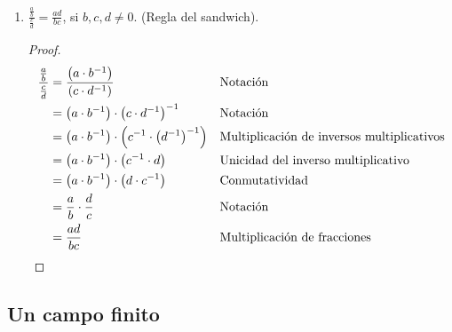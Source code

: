 \documentclass[11pt]{article}
\begin{document}
\begin{enumerate}[label=\alph*)]

    \item $\frac{\frac{a}{b}}{\frac{c}{d}} = \frac{ad}{bc}$, si $b, c, d \neq 0$. (Regla del sandwich).
    \vspace{-1em}\begin{proof} 
        \begin{align*}
            \frac{\frac{a}{b}}{\frac{c}{d}} &= \frac{\left( a \cdot b^{-1} \right)}{\left( c \cdot d^{-1} \right)} && \text{Notación}\\
            &= \left( a \cdot b^{-1} \right) \cdot \left( c \cdot d^{-1} \right)^{-1} && \text{Notación}\\
            &= \left( a \cdot b^{-1} \right) \cdot \left( c^{-1} \cdot \left( d^{-1} \right) ^{-1} \right) && \text{Multiplicación de inversos multiplicativos}\\
            &= \left( a \cdot b^{-1} \right) \cdot \left( c^{-1} \cdot d \right) && \text{Unicidad del inverso multiplicativo}\\
            &= \left( a \cdot b^{-1} \right) \cdot \left( d \cdot c^{-1} \right) && \text{Conmutatividad}\\
            &= \frac{a}{b} \cdot \frac{d}{c} && \text{Notación}\\
            &= \frac{ad}{bc} && \text{Multiplicación de fracciones} \qedhere
        \end{align*}     
    \end{proof} \vspace{-1em}
\end{enumerate}

\pagebreak

\subsection*{Un campo finito}
\end{document}
